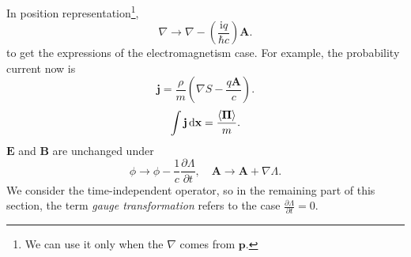 \documentclass{article}
\theoremstyle{1}
\newcommand{\pa}{\partial}
\newcommand{\ii}{\mathrm{i}}
\begin{document}
In position representation\footnote{We can use it only when the $\nabla$ comes from $\mathbf{p}$.},
\begin{equation}
    \nabla\longrightarrow \nabla-\left(\frac{\ii q}{\hbar c}\right)\mathbf{A}.
\end{equation}
to get the expressions of the electromagnetism case. For example, the probability current now is 
\begin{equation}\label{12.8}
    \mathbf{j}=\frac{\rho}{m}\left(\nabla S-\frac{q\mathbf{A}}{c}\right).
\end{equation}
\begin{equation}
    \int \mathbf{j}\dd{\mathbf{x}}=\frac{\expval{\mathbf{\Pi}}}{m}.
\end{equation}
$\mathbf{E}$ and $\mathbf{B}$ are unchanged under
\begin{equation}
    \phi\rightarrow \phi-\frac{1}{c}\frac{\pa \Lambda}{\pa t},\quad \mathbf{A}\rightarrow\mathbf{A}+\nabla \Lambda.
\end{equation}
We consider the time-independent operator, so in the remaining part of this section, the term \textit{gauge transformation} refers to the case $\frac{\pa \Lambda}{\pa t}=0$.
\end{document}
